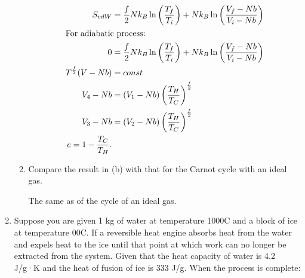 \documentclass{zc-ust-hw}
\begin{document}
\begin{enumerate}
\begin{enumerate}
\begin{sol}
\begin{align}
          S_{vdW}&=\frac{f}{2}Nk_B\ln \left( \frac{T_f}{T_i} \right) +Nk_B\ln \left( \frac{V_f-Nb}{V_i-Nb} \right) \\
          \intertext{For adiabatic process:}
          0&=\frac{f}{2}Nk_B\ln \left( \frac{T_f}{T_i} \right) +Nk_B\ln \left( \frac{V_f-Nb}{V_i-Nb} \right) \\
          T^{\frac{f}{2}}(V-Nb)&=const \\
          V_4-Nb&=(V_1-Nb)\left( \frac{T_H}{T_C} \right)^{\frac{f}{2}} \\
          V_3-Nb&=(V_2-Nb)\left( \frac{T_H}{T_C} \right)^{\frac{f}{2}} \\
          e = 1-\frac{T_C}{T_H}
        .\end{align}
      \end{sol}
    \item Compare the result in (b) with that for the Carnot cycle with an ideal gas.
      \begin{sol}
        The same as of the cycle of an ideal gas.
      \end{sol}
  \end{enumerate}

  \newpage

\item Suppose you are given 1 kg of water at temperature 1000C and a block of
  ice at temperature 00C. If a reversible heat engine absorbs heat from the
  water and expels heat to the ice until that point at which work can no longer
  be extracted from the system. Given that the heat capacity of water is 4.2
  J/g·K and the heat of fusion of ice is 333 J/g. When the process is complete: 


\end{enumerate}
\end{document}
